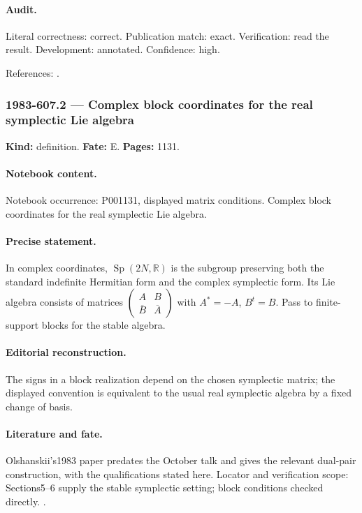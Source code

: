 \paragraph{Audit.} Literal correctness: correct. Publication match: exact. Verification: read the result. Development: annotated. Confidence: high.

\noindent References: \citep{olshanskii1983pairs}.\par

\subsubsection{1983-607.2 --- Complex block coordinates for the real symplectic Lie algebra}

\label{item:1983-607.2}

\noindent\textbf{Kind:} definition. \textbf{Fate:} E. \textbf{Pages:} 1131.\par

\paragraph{Notebook content.} Notebook occurrence: P001131, displayed matrix conditions. Complex block coordinates for the real symplectic Lie algebra.

\paragraph{Precise statement.} In complex coordinates, \(\operatorname{Sp}(2N,\mathbb R)\) is the subgroup preserving both the standard indefinite Hermitian form and the complex symplectic form. Its Lie algebra consists of matrices \(\begin{pmatrix}A&B\\ \overline B&\overline A\end{pmatrix}\) with \(A^*=-A\), \(B^t=B\). Pass to finite-support blocks for the stable algebra.

\paragraph{Editorial reconstruction.} The signs in a block realization depend on the chosen symplectic matrix; the displayed convention is equivalent to the usual real symplectic algebra by a fixed change of basis.

\paragraph{Literature and fate.} Olshanskii's1983 paper predates the October talk and gives the relevant dual-pair construction, with the qualifications stated here. Locator and verification scope: Sections5--6 supply the stable symplectic setting; block conditions checked directly. \cite{olshanskii1983pairs}.

